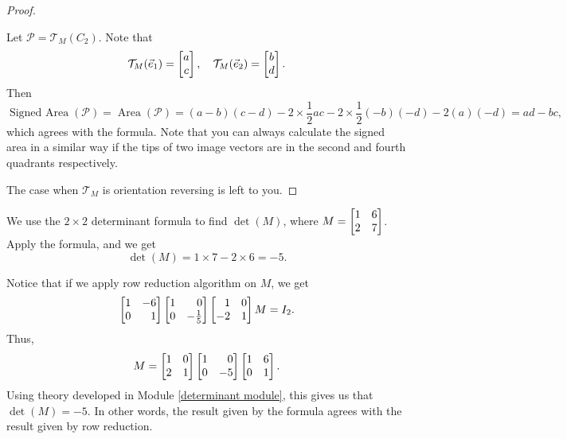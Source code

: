 \begin{proof}
\begin{center}
\end{center}
Let $\mathcal{P}=\mathcal{T}_M(C_2)$. Note that \[\mathcal{T}_{M}({\vec e_1})= \begin{bmatrix}a \\ c\end{bmatrix},\quad \mathcal{T}_{M}({\vec e_2})=\begin{bmatrix}b \\ d\end{bmatrix}.\] Then \[\operatorname{Signed~Area}(\mathcal{P})=\operatorname{Area}(\mathcal{P})=(a-b)(c-d)-2\times \frac{1}{2}ac-2\times \frac{1}{2}(-b)(-d)-2(a)(-d)=ad-bc,\] which agrees with the formula. Note that you can always calculate the signed area in a similar way if the tips of two image vectors are in the second and fourth quadrants respectively.

The case when $\mathcal{T}_{M}$ is orientation reversing is left to you.
\end{proof}
\begin{example}
	We use the $2\times 2$ determinant formula to find $\det(M)$, where
	$M=\mat{1 & 6 \\ 2 & 7}$. Apply the formula, and we get
	\[
		\det(M)=1\times 7-2\times 6=-5.
	\]
\end{example}
Notice that if we apply row reduction algorithm on $M$, we get
\[
	\mat{1 & -6 \\ 0 & 1}\mat{1 & 0 \\ 0 & -\frac{1}{5}}\mat{1 & 0 \\ -2 & 1}M=I_{2}.
\]
Thus,
\[
	M=\mat{1 & 0 \\ 2 & 1}\mat{1 & 0 \\ 0 & -5}\mat{1 & 6 \\ 0 & 1}.
\]
Using theory developed in Module \ref{determinant module}, this gives us that
$\det(M)=-5$. In other words, the result given by the formula agrees with the
result given by row reduction.


